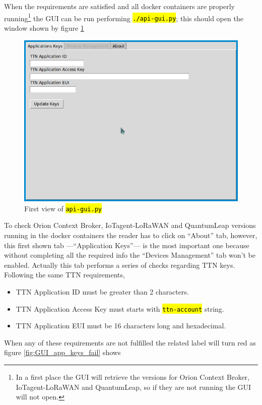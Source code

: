 \documentclass[11pt,a4paper,dvipsnames,twoside]{article}
\newcommand{\cmd}[1] {\hl{\texttt{#1}}}
\begin{document}
When the requirements are satisfied and all docker containers are properly running\footnote{In a first place the GUI will retrieve the versions for Orion Context Broker, IoTagent-LoRaWAN and QuantumLeap, so if they are not running the GUI will not open.} the GUI can be run performing \cmd{./api-gui.py}; this should open the window shown by figure \ref{fig:GUI_app_keys}

\begin{figure}[ht]
  \centering
  \includegraphics[width=.9\textwidth]{../pictures/GUI_app_keys.png}
  \caption{First view of \cmd{api-gui.py}}
  \label{fig:GUI_app_keys}
\end{figure}

To check Orion Context Broker, IoTagent-LoRaWAN and QuantumLeap versions running in the docker containers the reader has to click on \enquote{About} tab, however, this first shown tab ---\enquote{Application Keys}--- is the most important one because without completing all the required info the \enquote{Devices Management} tab won't be enabled. Actually this tab performs a series of checks regarding TTN keys. Following the same TTN requirements, 

\begin{itemize}
  \item TTN Application ID must be greater than 2 characters.
  \item TTN Application Access Key must starts with \cmd{ttn-account} string.
  \item TTN Application EUI must be 16 characters long and hexadecimal. 
\end{itemize}

When any of these requirements are not fulfilled the related label will turn red as figure \ref{fig:GUI_app_keys_fail} shows
\end{document}
